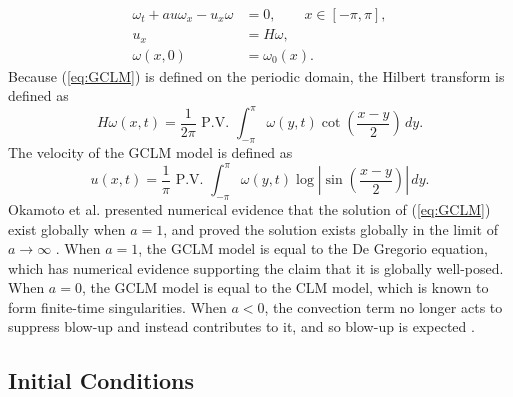 \documentclass[12pt]{article}
\newcommand{\lr}{\left(}
\newcommand{\rr}{\right)}
\newcommand{\lv}{\left|}
\newcommand{\rv}{\right|}
\def\w{\omega}
\def\wt{\omega_t}
\def\wx{\omega_x}
\def\ux{u_x}
\numberwithin{equation}{section}
\begin{document}
\begin{subequations}\label{eq:GCLM}
\begin{align}
\wt + au\wx - \ux\w &= 0, \qquad x\in[-\pi,\pi],\\
u_x &= H\w,\\
\w(x,0) &= \w_0(x).
\end{align}
\end{subequations}
Because (\ref{eq:GCLM}) is defined on the periodic domain, the Hilbert transform is defined as
\begin{equation}\label{eq:Hilbert:Transform:GCLM}
H\w(x,t) = \frac{1}{2\pi}\text{ P.V. }\int_{-\pi}^{\pi}\w(y,t)\cot\lr\frac{x-y}{2}\rr\,dy.
\end{equation}
The velocity of the GCLM model is defined as
\begin{equation}\label{eq:Velocity:GCLM}
u(x,t) = \frac{1}{\pi}\text{ P.V. }\int_{-\pi}^{\pi}\w(y,t)\log\lv\sin\lr\frac{x-y}{2}\rr \rv \, dy.
\end{equation}
Okamoto et al. presented numerical evidence that the solution of (\ref{eq:GCLM}) exist globally when $a=1$, and proved the solution exists globally in the limit of $a\rightarrow\infty$ \cite{okamoto_generalization_2008}. When $a=1$, the GCLM model is equal to the De Gregorio equation, which has numerical evidence supporting the claim that it is globally well-posed. When $a=0$, the GCLM model is equal to the CLM model, which is known to form finite-time singularities. When $a<0$, the convection term no longer acts to suppress blow-up and instead contributes to it, and so blow-up is expected \cite{chen_singularity_2020}. 

\subsection{Initial Conditions}
\end{document}
